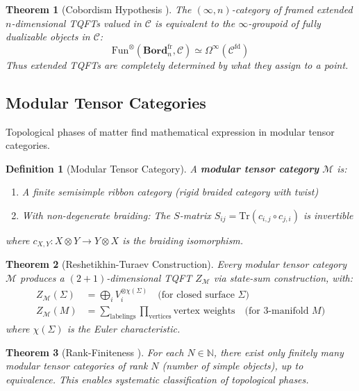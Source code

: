 \documentclass[11pt,a4paper]{article}
\newtheorem{theorem}{Theorem}[section]
\newtheorem{definition}{Definition}[section]
\theoremstyle{remark}
\theoremstyle{definition}
\begin{document}
\begin{theorem}[Cobordism Hypothesis \cite{Lurie2009}]
The $(\infty, n)$-category of framed extended $n$-dimensional TQFTs valued in $\mathcal{C}$ is equivalent to the $\infty$-groupoid of fully dualizable objects in $\mathcal{C}$:
\begin{equation}
\text{Fun}^\otimes(\textbf{Bord}_n^{\text{fr}}, \mathcal{C}) \simeq \Omega^\infty(\mathcal{C}^{\text{fd}})
\end{equation}
Thus extended TQFTs are completely determined by what they assign to a point.
\end{theorem}

\subsection{Modular Tensor Categories}

Topological phases of matter find mathematical expression in modular tensor categories.

\begin{definition}[Modular Tensor Category]
A \textbf{modular tensor category} $\mathcal{M}$ is:
\begin{enumerate}[label=(\roman*)]
\item A finite semisimple ribbon category (rigid braided category with twist)
\item With non-degenerate braiding: The $S$-matrix $S_{ij} = \text{Tr}(c_{i,j} \circ c_{j,i})$ is invertible
\end{enumerate}
where $c_{X,Y}: X \otimes Y \to Y \otimes X$ is the braiding isomorphism.
\end{definition}

\begin{theorem}[Reshetikhin-Turaev Construction]
Every modular tensor category $\mathcal{M}$ produces a $(2+1)$-dimensional TQFT $Z_{\mathcal{M}}$ via state-sum construction, with:
\begin{align}
Z_{\mathcal{M}}(\Sigma) &= \bigoplus_{i} V_i^{\otimes \chi(\Sigma)} \quad \text{(for closed surface $\Sigma$)} \\
Z_{\mathcal{M}}(M) &= \sum_{\text{labelings}} \prod_{\text{vertices}} \text{vertex weights} \quad \text{(for 3-manifold $M$)}
\end{align}
where $\chi(\Sigma)$ is the Euler characteristic.
\end{theorem}

\begin{theorem}[Rank-Finiteness \cite{RankFiniteness2024}]
For each $N \in \mathbb{N}$, there exist only finitely many modular tensor categories of rank $N$ (number of simple objects), up to equivalence. This enables systematic classification of topological phases.
\end{theorem}
\end{document}
